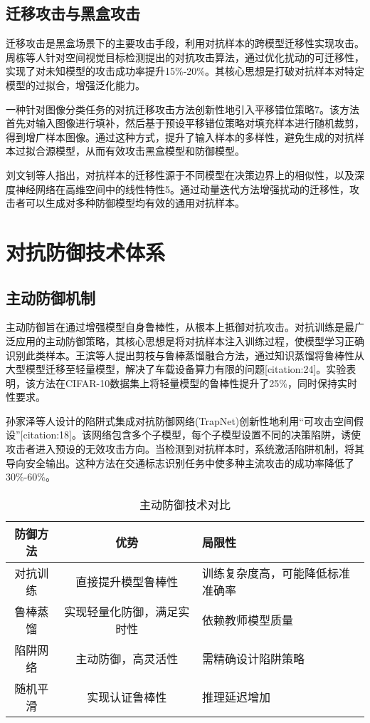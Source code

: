 \documentclass[acmtog]{ctexart}
\begin{document}
\subsection{迁移攻击与黑盒攻击}

迁移攻击是黑盒场景下的主要攻击手段，利用对抗样本的跨模型迁移性实现攻击。周栋等人针对空间视觉目标检测提出的对抗攻击算法，通过优化扰动的可迁移性，实现了对未知模型的攻击成功率提升15\%-20\%。其核心思想是打破对抗样本对特定模型的过拟合，增强泛化能力。

一种针对图像分类任务的对抗迁移攻击方法创新性地引入平移错位策略7。该方法首先对输入图像进行填补，然后基于预设平移错位策略对填充样本进行随机裁剪，得到增广样本图像。通过这种方式，提升了输入样本的多样性，避免生成的对抗样本过拟合源模型，从而有效攻击黑盒模型和防御模型。

刘文钊等人指出，对抗样本的迁移性源于不同模型在决策边界上的相似性，以及深度神经网络在高维空间中的线性特性5。通过动量迭代方法增强扰动的迁移性，攻击者可以生成对多种防御模型均有效的通用对抗样本。

\section{对抗防御技术体系}

\subsection{主动防御机制}

主动防御旨在通过增强模型自身鲁棒性，从根本上抵御对抗攻击。对抗训练是最广泛应用的主动防御策略，其核心思想是将对抗样本注入训练过程，使模型学习正确识别此类样本。王滨等人提出剪枝与鲁棒蒸馏融合方法，通过知识蒸馏将鲁棒性从大型模型迁移至轻量模型，解决了车载设备算力有限的问题[citation:24]。实验表明，该方法在CIFAR-10数据集上将轻量模型的鲁棒性提升了25\%，同时保持实时性要求。

孙家泽等人设计的陷阱式集成对抗防御网络(TrapNet)创新性地利用“可攻击空间假设”[citation:18]。该网络包含多个子模型，每个子模型设置不同的决策陷阱，诱使攻击者进入预设的无效攻击方向。当检测到对抗样本时，系统激活陷阱机制，将其导向安全输出。这种方法在交通标志识别任务中使多种主流攻击的成功率降低了30\%-60\%。

\begin{table}
  \caption{主动防御技术对比}
  \label{tab:freq}
  \begin{tabular}{ccl}
    \toprule
    防御方法&优势&局限性\\
    \midrule
    对抗训练&直接提升模型鲁棒性&训练复杂度高，可能降低标准准确率\\
    鲁棒蒸馏&实现轻量化防御，满足实时性&依赖教师模型质量\\
    陷阱网络&主动防御，高灵活性&需精确设计陷阱策略\\
    随机平滑&实现认证鲁棒性&推理延迟增加\\
  \bottomrule
\end{tabular}
\end{table}
\end{document}
